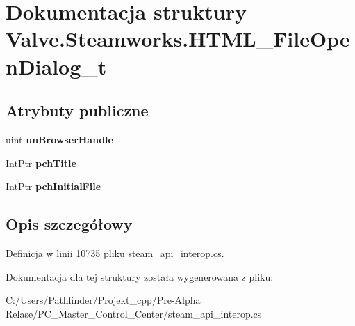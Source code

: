 \hypertarget{struct_valve_1_1_steamworks_1_1_h_t_m_l___file_open_dialog__t}{}\section{Dokumentacja struktury Valve.\+Steamworks.\+H\+T\+M\+L\+\_\+\+File\+Open\+Dialog\+\_\+t}
\label{struct_valve_1_1_steamworks_1_1_h_t_m_l___file_open_dialog__t}
\subsection*{Atrybuty publiczne}
\begin{DoxyCompactItemize}
\item 
\mbox{\label{struct_valve_1_1_steamworks_1_1_h_t_m_l___file_open_dialog__t_ae4d421f56499fae7352cc496b5e80fca}} 
uint {\bfseries un\+Browser\+Handle}
\item 
\mbox{\label{struct_valve_1_1_steamworks_1_1_h_t_m_l___file_open_dialog__t_a1b53b7dc2b39efd50935db92962417be}} 
Int\+Ptr {\bfseries pch\+Title}
\item 
\mbox{\label{struct_valve_1_1_steamworks_1_1_h_t_m_l___file_open_dialog__t_a086370c0283bebbea3290e405ef4302e}} 
Int\+Ptr {\bfseries pch\+Initial\+File}
\end{DoxyCompactItemize}


\subsection{Opis szczegółowy}


Definicja w linii 10735 pliku steam\+\_\+api\+\_\+interop.\+cs.



Dokumentacja dla tej struktury została wygenerowana z pliku\+:\begin{DoxyCompactItemize}
\item 
C\+:/\+Users/\+Pathfinder/\+Projekt\+\_\+cpp/\+Pre-\/\+Alpha Relase/\+P\+C\+\_\+\+Master\+\_\+\+Control\+\_\+\+Center/steam\+\_\+api\+\_\+interop.\+cs\end{DoxyCompactItemize}
